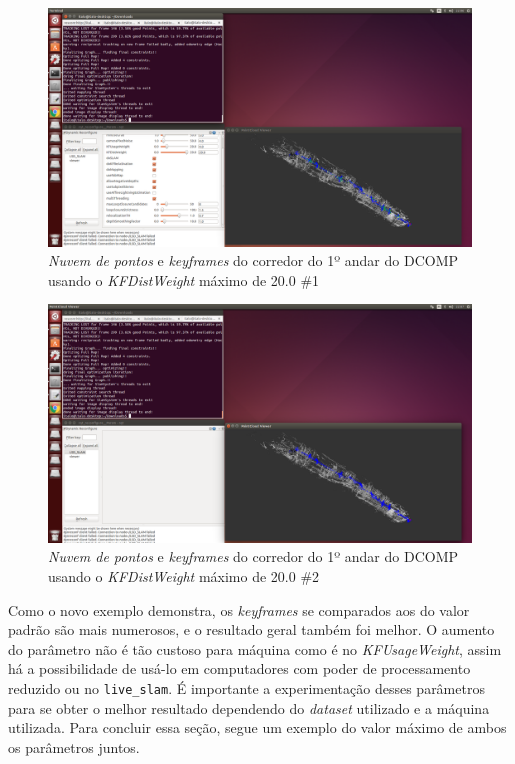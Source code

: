 \begin{figure}[H]
	\centering
		\includegraphics[width= \textwidth]{Imagens/figura3-38.png}
	\caption{\textit{Nuvem de pontos} e \textit{keyframes} do corredor do 1º andar do DCOMP usando o \textit{KFDistWeight} máximo de 20.0 \#1}
	\label{fig3:36}
\end{figure}

\begin{figure}[H]
	\centering
		\includegraphics[width= \textwidth]{Imagens/figura3-39.png}
	\caption{\textit{Nuvem de pontos} e \textit{keyframes} do corredor do 1º andar do DCOMP usando o \textit{KFDistWeight} máximo de 20.0 \#2}
	\label{fig3:37}
\end{figure}

Como o novo exemplo demonstra, os \textit{keyframes} se comparados aos do valor padrão são mais numerosos, e o resultado geral também foi melhor. O aumento do parâmetro não é tão custoso para máquina como é no \textit{KFUsageWeight}, assim há a possibilidade de usá-lo em computadores com poder de processamento reduzido ou no \texttt{live\_slam}. É importante a experimentação desses parâmetros para se obter o melhor resultado dependendo do \textit{dataset} utilizado e a máquina utilizada. Para concluir essa seção, segue um exemplo do valor máximo de ambos os parâmetros juntos.

